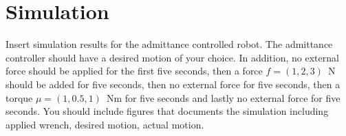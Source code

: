 \documentclass[a4paper,10pt,oneside]{article}
\begin{document}
\section{Simulation}
{\color{red}Insert simulation results for the admittance controlled robot. The admittance controller should have a desired motion of your choice. In addition, no external force should be applied for the first five seconds, then a force $f=(1,2,3)$~N should be added for five seconds, then no external force for five seconds, then a torque $\mu=(1,0.5,1)$~Nm for five seconds and lastly no external force for five seconds. You should include figures that documents the simulation including applied wrench, desired motion, actual motion.}
\end{document}

